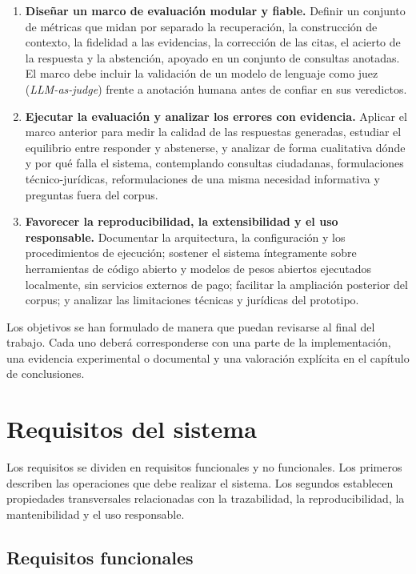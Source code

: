 \begin{enumerate}
    \item[\textbf{OE-06}] \textbf{Diseñar un marco de evaluación modular y fiable.} Definir un conjunto de métricas que midan por separado la recuperación, la construcción de contexto, la fidelidad a las evidencias, la corrección de las citas, el acierto de la respuesta y la abstención, apoyado en un conjunto de consultas anotadas. El marco debe incluir la validación de un modelo de lenguaje como juez (\emph{LLM-as-judge}) frente a anotación humana antes de confiar en sus veredictos.

    \item[\textbf{OE-07}] \textbf{Ejecutar la evaluación y analizar los errores con evidencia.} Aplicar el marco anterior para medir la calidad de las respuestas generadas, estudiar el equilibrio entre responder y abstenerse, y analizar de forma cualitativa dónde y por qué falla el sistema, contemplando consultas ciudadanas, formulaciones técnico-jurídicas, reformulaciones de una misma necesidad informativa y preguntas fuera del corpus.

    \item[\textbf{OE-08}] \textbf{Favorecer la reproducibilidad, la extensibilidad y el uso responsable.} Documentar la arquitectura, la configuración y los procedimientos de ejecución; sostener el sistema íntegramente sobre herramientas de código abierto y modelos de pesos abiertos ejecutados localmente, sin servicios externos de pago; facilitar la ampliación posterior del corpus; y analizar las limitaciones técnicas y jurídicas del prototipo.
\end{enumerate}

Los objetivos se han formulado de manera que puedan revisarse al final del trabajo. Cada uno deberá corresponderse con una parte de la implementación, una evidencia experimental o documental y una valoración explícita en el capítulo de conclusiones.

\section{Requisitos del sistema}
\label{sec:requisitos}

Los requisitos se dividen en requisitos funcionales y no funcionales. Los primeros describen las operaciones que debe realizar el sistema. Los segundos establecen propiedades transversales relacionadas con la trazabilidad, la reproducibilidad, la mantenibilidad y el uso responsable.

\subsection{Requisitos funcionales}
\label{subsec:requisitos-funcionales}

